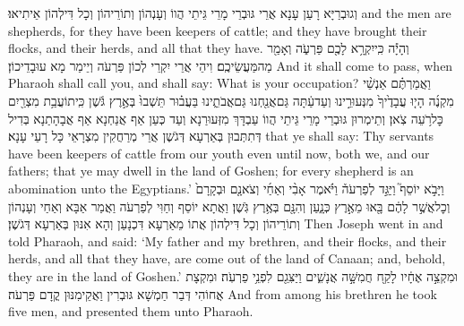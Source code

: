 {וְגוּבְרַיָּא רָעַן עָנָא אֲרֵי גּוּבְרֵי מָרֵי גֵּיתֵי הֲווֹ וְעָנְהוֹן וְתוֹרֵיהוֹן וְכָל דִּילְהוֹן אֵיתִיאוּ׃}
{and the men are shepherds, for they have been keepers of cattle; and they have brought their flocks, and their herds, and all that they have.}{}
{וְהָיָ֕ה כִּֽי\maqqaf יִקְרָ֥א לָכֶ֖ם פַּרְעֹ֑ה וְאָמַ֖ר מַה\maqqaf מַּעֲשֵׂיכֶֽם׃}
{וִיהֵי אֲרֵי יִקְרֵי לְכוֹן פַּרְעֹה וְיֵימַר מָא עוּבָדֵיכוֹן׃}
{And it shall come to pass, when Pharaoh shall call you, and shall say: What is your occupation?}{}
{וַאֲמַרְתֶּ֗ם אַנְשֵׁ֨י מִקְנֶ֜ה הָי֤וּ עֲבָדֶ֙יךָ֙ מִנְּעוּרֵ֣ינוּ וְעַד\maqqaf עַ֔תָּה גַּם\maqqaf אֲנַ֖חְנוּ גַּם\maqqaf אֲבֹתֵ֑ינוּ בַּעֲב֗וּר תֵּשְׁבוּ֙ בְּאֶ֣רֶץ גֹּ֔שֶׁן כִּֽי\maqqaf תוֹעֲבַ֥ת מִצְרַ֖יִם כׇּל\maqqaf רֹ֥עֵה צֹֽאן׃}
{וְתֵימְרוּן גּוּבְרֵי מָרֵי גֵּיתֵי הֲווֹ עַבְדָּךְ מִזְּעוּרַנָא וְעַד כְּעַן אַף אֲנַחְנָא אַף אֲבָהָתַנָא בְּדִיל דְּתִתְּבוּן בְּאַרְעָא דְּגֹשֶׁן אֲרֵי מְרַחֲקִין מִצְרָאֵי כָּל רָעֵי עָנָא׃}
{that ye shall say: Thy servants have been keepers of cattle from our youth even until now, both we, and our fathers; that ye may dwell in the land of Goshen; for every shepherd is an abomination unto the Egyptians.’}{}
\newperek
{}%
{וַיָּבֹ֣א יוֹסֵף֮ וַיַּגֵּ֣ד לְפַרְעֹה֒ וַיֹּ֗אמֶר אָבִ֨י וְאַחַ֜י וְצֹאנָ֤ם וּבְקָרָם֙ וְכׇל\maqqaf אֲשֶׁ֣ר לָהֶ֔ם בָּ֖אוּ מֵאֶ֣רֶץ כְּנָ֑עַן וְהִנָּ֖ם בְּאֶ֥רֶץ גֹּֽשֶׁן׃}
{וַאֲתָא יוֹסֵף וְחַוִּי לְפַרְעֹה וַאֲמַר אַבָּא וְאַחַי וְעָנְהוֹן וְתוֹרֵיהוֹן וְכָל דִּילְהוֹן אֲתוֹ מֵאַרְעָא דִּכְנָעַן וְהָא אִנּוּן בְּאַרְעָא דְּגֹשֶׁן׃}
{Then Joseph went in and told Pharaoh, and said: ‘My father and my brethren, and their flocks, and their herds, and all that they have, are come out of the land of Canaan; and, behold, they are in the land of Goshen.’}{}
{וּמִקְצֵ֣ה אֶחָ֔יו לָקַ֖ח חֲמִשָּׁ֣ה אֲנָשִׁ֑ים וַיַּצִּגֵ֖ם לִפְנֵ֥י פַרְעֹֽה׃}
{וּמִקְצָת אֲחוֹהִי דְּבַר חַמְשָׁא גּוּבְרִין וַאֲקֵימִנּוּן קֳדָם פַּרְעֹה׃}
{And from among his brethren he took five men, and presented them unto Pharaoh.}{}
